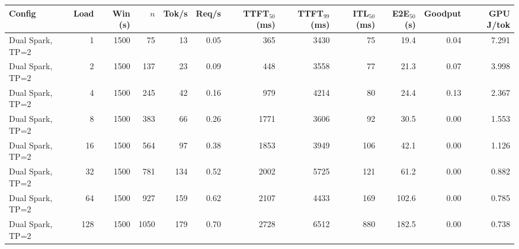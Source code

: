 \begin{tabular}{l r r r r r r r r r r r}
\toprule
Config & Load & Win (s) & $n$ & Tok/s & Req/s & TTFT$_{50}$ (ms) & TTFT$_{99}$ (ms) & ITL$_{50}$ (ms) & E2E$_{50}$ (s) & Goodput & GPU J/tok \\
\midrule
Dual Spark, TP=2 & 1 & 1500 & 75\rlap{$^\dagger$} & 13 & 0.05 & 365 & 3430 & 75 & 19.4 & 0.04 & 7.291 \\
Dual Spark, TP=2 & 2 & 1500 & 137 & 23 & 0.09 & 448 & 3558 & 77 & 21.3 & 0.07 & 3.998 \\
Dual Spark, TP=2 & 4 & 1500 & 245 & 42 & 0.16 & 979 & 4214 & 80 & 24.4 & 0.13 & 2.367 \\
Dual Spark, TP=2 & 8 & 1500 & 383 & 66 & 0.26 & 1771 & 3606 & 92 & 30.5 & 0.00 & 1.553 \\
Dual Spark, TP=2 & 16 & 1500 & 564 & 97 & 0.38 & 1853 & 3949 & 106 & 42.1 & 0.00 & 1.126 \\
Dual Spark, TP=2 & 32 & 1500 & 781 & 134 & 0.52 & 2002 & 5725 & 121 & 61.2 & 0.00 & 0.882 \\
Dual Spark, TP=2 & 64 & 1500 & 927 & 159 & 0.62 & 2107 & 4433 & 169 & 102.6 & 0.00 & 0.785 \\
Dual Spark, TP=2 & 128 & 1500 & 1050 & 179 & 0.70 & 2728 & 6512 & 880 & 182.5 & 0.00 & 0.738 \\
\bottomrule
\end{tabular}
